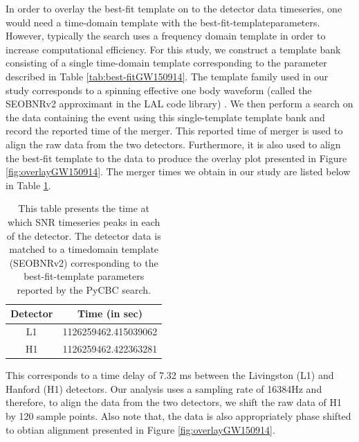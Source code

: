 In order to overlay the best-fit template on to the detector data timeseries, one would need a time-domain template with the best-fit-templateparameters. However, typically the search uses a frequency domain template in order to increase computational efficiency. For this study, we construct a template bank consisting of a single time-domain template corresponding to the parameter described in Table \ref{tab:best-fitGW150914}. The template family used in our study corresponds to a spinning effective one body waveform (called the SEOBNRv2 approximant in the LAL code library)  \cite{SEOBNRv2}. We then perform a search on the data containing the event using this single-template template bank and record the reported time of the merger. This reported time of merger is used to align the raw data from the two detectors. Furthermore, it is also used to align the best-fit template to the data to produce the overlay plot presented in Figure \ref{fig:overlayGW150914}. The merger times we obtain in our study are listed below in Table \ref{tab:arrival-time}.


\begin{table}[]
\centering
\begin{tabular}{|c|c|}
\hline
Detector & Time (in sec)        \\ \hline
L1       & 1126259462.415039062 \\
H1       & 1126259462.422363281 \\ \hline
\end{tabular}
\caption{This table presents the time at which SNR timeseries peaks in each of the detector. The detector data is matched to a timedomain template (SEOBNRv2) corresponding to the best-fit-template parameters reported by the PyCBC search.}
\label{tab:arrival-time}
\end{table}

This corresponds to a time delay of 7.32 ms between the Livingston (L1) and Hanford (H1) detectors. Our analysis uses a sampling rate of 16384Hz and therefore, to align the data from the two detectors, we shift the raw data of H1 by 120 sample points. Also note that, the data is also appropriately phase shifted to obtian alignment presented in Figure \ref{fig:overlayGW150914}.

